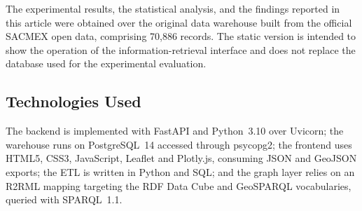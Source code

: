 \documentclass[runningheads]{llncs}
\renewcommand{\_}{\origunderscore\allowbreak}
\newif\ifshowchanges
\newcommand{\new}[1]{\ifshowchanges\textcolor{chg}{#1}\else#1\fi}
\begin{document}
The experimental results, the statistical analysis, and the findings reported in
this article were obtained over the original data warehouse built from the
official SACMEX open data, comprising 70,886 records. The static version is
intended to show the operation of the information-retrieval interface and does
not replace the database used for the experimental evaluation.


\subsection{Technologies Used}

The backend is implemented with FastAPI and Python~3.10 over Uvicorn; the
warehouse runs on PostgreSQL~14 accessed through psycopg2; the frontend uses
HTML5, CSS3, JavaScript, Leaflet and Plotly.js, consuming JSON and GeoJSON
exports; the ETL is written in Python and SQL; and \new{the graph layer relies
on an R2RML mapping targeting the RDF Data Cube and GeoSPARQL vocabularies,
queried with SPARQL~1.1}.
\end{document}

